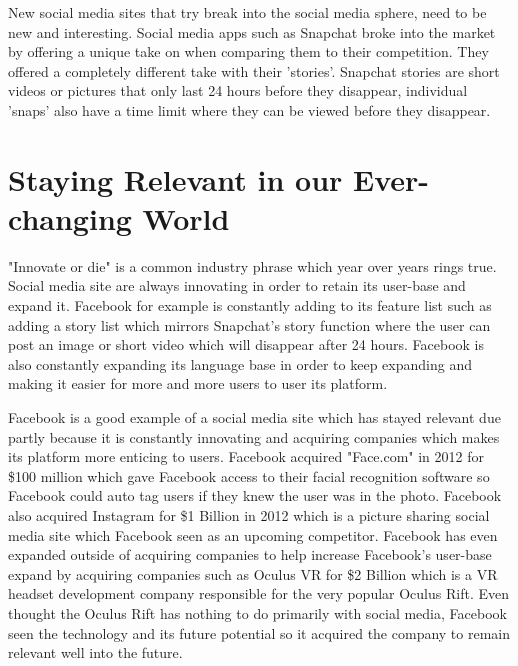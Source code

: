 New social media sites that try break into the social media sphere, need to be new and interesting. Social media apps such as Snapchat broke into the market by offering a unique take on when comparing them to their competition. They offered a completely different take with their 'stories'. Snapchat stories are short videos or pictures that only last 24 hours before they disappear, individual 'snaps' also have a time limit where they can be viewed before they disappear.

\section{Staying Relevant in our Ever-changing World} 
"Innovate or die" is a common industry phrase which year over years rings true. Social media site are always innovating in order to retain its user-base and expand it. Facebook for example is constantly adding to its feature list such as adding a story list which mirrors Snapchat's story function where the user can post an image or short video which will disappear after 24 hours. Facebook is also constantly expanding its language base in order to keep expanding and making it easier for more and more users to user its platform. 

Facebook is a good example of a social media site which has stayed relevant due partly because it is constantly innovating and acquiring companies which makes its platform more enticing to users. Facebook acquired "Face.com" in 2012 for \$100 million which gave Facebook access to their facial recognition software so Facebook could auto tag users if they knew the user was in the photo. Facebook also acquired Instagram for \$1 Billion in 2012 which is a picture sharing social media site which Facebook seen as an upcoming competitor. Facebook has even expanded outside of acquiring companies to help increase Facebook's user-base expand by acquiring companies such as Oculus VR for \$2 Billion which is a VR headset development company responsible for the very popular Oculus Rift. Even thought the Oculus Rift has nothing to do primarily with social media, Facebook seen the technology and its future potential so it acquired the company to remain relevant well into the future.
